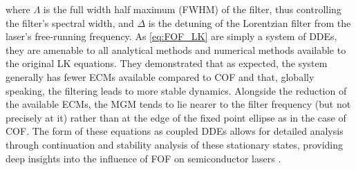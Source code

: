 where $\Lambda$ is the full width half maximum (FWHM) of the filter, thus controlling the filter's spectral width, and $\Delta$ is the detuning of the Lorentzian filter from the laser's free-running frequency. As \eqref{eq:FOF_LK} are simply a system of DDEs, they are amenable to all analytical methods and numerical methods available to the original LK equations. They demonstrated that as expected, the system generally has fewer ECMs available compared to COF and that, globally speaking, the filtering leads to more stable dynamics. Alongside the reduction of the available ECMs, the MGM tends to lie nearer to the filter frequency (but not precisely at it) rather than at the edge of the fixed point ellipse as in the case of COF. The form of these equations as coupled DDEs allows for detailed analysis through continuation and stability analysis of these stationary states, providing deep insights into the influence of FOF on semiconductor lasers \cite{erzgraber2006frequency, erzgraber2007bifurcation, erzgraber2007dynamics, fischer2000experimental, fischer2004experimental, green2006mode, hek2007semiconductor, erzgraber2007feedback, fischer2004filtered, yousefi2001global, yousefi2002simulations, yousefi2003nonlinear}. 
%
%
